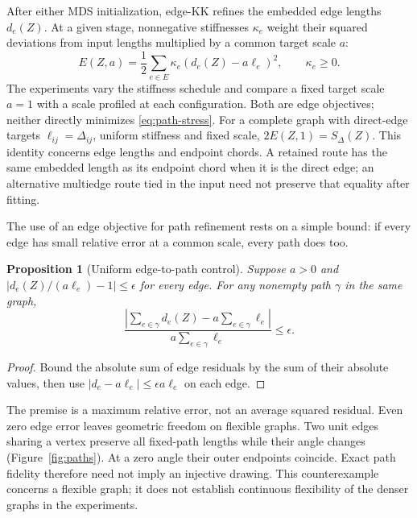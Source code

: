 \documentclass[11pt]{article}
\newtheorem{proposition}{Proposition}
\begin{document}
After either MDS initialization, edge-KK refines the embedded
edge lengths $d_e(Z)$. At a given stage, nonnegative stiffnesses $\kappa_e$
weight their squared deviations from input lengths multiplied by a common
target scale $a$:
\begin{equation}
 E(Z,a)=\frac12\sum_{e\in E}\kappa_e(d_e(Z)-a\ell_e)^2,
 \qquad \kappa_e\ge0.
 \label{eq:edge}
\end{equation}
The experiments vary the stiffness schedule and compare a fixed target scale
$a=1$ with a scale profiled at each configuration. Both are edge objectives;
neither directly minimizes \eqref{eq:path-stress}.
For a complete graph with direct-edge targets $\ell_{ij}=\Delta_{ij}$,
uniform stiffness and fixed scale, $2E(Z,1)=S_\Delta(Z)$. This identity concerns
edge lengths and endpoint chords. A retained route has the same embedded
length as its endpoint chord when it is the direct edge; an alternative
multiedge route tied in the input need not preserve that equality after fitting.

The use of an edge objective for path refinement rests on a simple bound:
if every edge has small relative error at a common scale, every path does too.
\begin{proposition}[Uniform edge-to-path control]\label{prop:path}
Suppose $a>0$ and $|d_e(Z)/(a\ell_e)-1|\le\epsilon$ for every edge. For any
nonempty path $\gamma$ in the same graph,
\[
 \frac{|\sum_{e\in\gamma}d_e(Z)-a\sum_{e\in\gamma}\ell_e|}
 {a\sum_{e\in\gamma}\ell_e}\le\epsilon.
\]
\end{proposition}
\begin{proof}
Bound the absolute sum of edge residuals by the sum of their absolute values,
then use $|d_e-a\ell_e|\le\epsilon a\ell_e$ on each edge.
\end{proof}
The premise is a maximum relative error, not an average squared residual.
Even zero edge error leaves geometric freedom on flexible graphs. Two unit
edges sharing a vertex preserve all fixed-path lengths while their angle
changes (Figure~\ref{fig:paths}). At a zero angle their outer endpoints
coincide. Exact path fidelity therefore need not imply an injective drawing.
This counterexample concerns a flexible graph; it does not establish
continuous flexibility of the denser graphs in the experiments.
\end{document}
